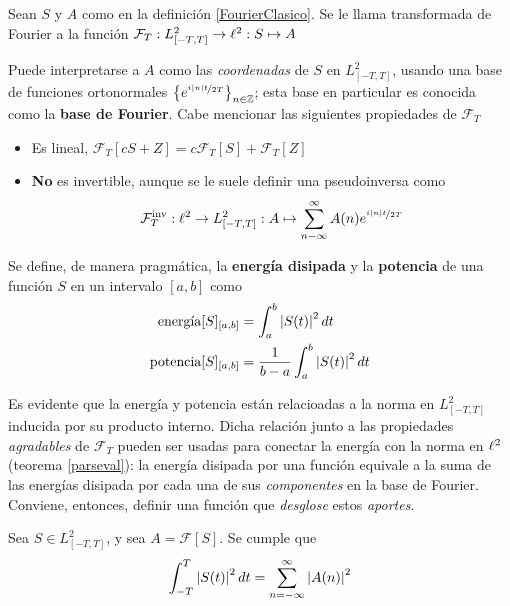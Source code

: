 \begin{definicion}
Sean $S$ y $A$ como en la definición \ref{FourierClasico}. Se le llama transformada de Fourier a la
función $\mathcal{F}_T : L^{2}_{[-T,T]} \rightarrow \ell^{2} : S \mapsto A$
\end{definicion}

Puede interpretarse a $A$ como las \textit{coordenadas} de $S$ en $L^{2}_{[-T,T]}$, usando una base 
de funciones ortonormales $\left\{ e^{\nicefrac{i \left| n \right| t}{2 T}} \right\}_{n\in \mathbb{Z}}$; esta base 
en particular es conocida como la \textbf{base de Fourier}.
%
Cabe mencionar las siguientes propiedades de $\mathcal{F}_T$
\begin{itemize}
\item Es lineal, $\mathcal{F}_T[cS + Z] = c\mathcal{F}_T[S] + \mathcal{F}_T[Z]$

\item \textbf{No} es invertible, aunque se le suele definir una pseudoinversa como
\begin{equation*}
\mathcal{F}_{T}^{\text{inv}} : \ell^{2} \rightarrow L^{2}_{[-T,T]} :
A \mapsto \sum_{n -\infty}^{\infty} A(n) e^{\nicefrac{i \left| n \right| t}{2 T}}
\end{equation*}
\end{itemize}

Se define, de manera pragmática, la \textbf{energía disipada} y la \textbf{potencia} de una función 
$S$ en un intervalo $[a,b]$ como 
\begin{align*}
\text{energía}[S]_{[a,b]} &= \int_a^{b} \left| S(t) \right|^{2} dt \\
\text{potencia}[S]_{[a,b]} &= \frac{1}{b-a} \int_a^{b} \left| S(t) \right|^{2} dt
\end{align*}

Es evidente que la energía y potencia están relacioadas a la norma en $L^{2}_{[-T,T]}$ inducida por
su producto interno.
%
Dicha relación junto a las propiedades \textit{agradables} de $\mathcal{F}_T$ pueden ser usadas 
para conectar la energía con la norma en $\ell^{2}$ (teorema \ref{parseval}): la energía disipada por 
una función equivale a la suma de las energías disipada por cada una de sus \textit{componentes} en 
la base de Fourier.
%
Conviene, entonces, definir una función que \textit{desglose} estos \textit{aportes}.

\begin{teorema}[Parseval]
Sea $S \in L^{2}_{[-T,T]}$, y sea $A = \mathcal{F}[S]$. Se cumple que
\begin{equation*}
\int_{-T}^{T} \left| S(t) \right|^{2} dt = \sum_{n=-\infty}^{\infty} \left| A(n) \right|^{2}
\end{equation*}
\label{parseval}
\end{teorema}

